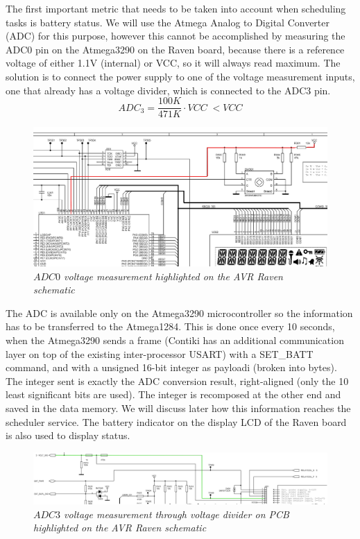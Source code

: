 The first important metric that needs to be taken into account when scheduling tasks is battery status. We will use the 
Atmega Analog to Digital Converter (ADC) for this purpose, however this cannot be accomplished by measuring the ADC0 
pin on the Atmega3290 on the Raven board, because there is a reference voltage of either 1.1V (internal) or VCC, so it 
will always read maximum. The solution is to connect the power supply to one of the voltage 
measurement inputs, one that already has a voltage divider, which is connected to the ADC3 pin.
\[ADC_3 = \frac{100K}{471K} \cdot VCC\;<VCC\]
\begin{figure}[ht]
 \begin{center}
  \includegraphics{static/adc0.png}
 \end{center}
  \caption{\small \itshape{$ADC0$ voltage measurement highlighted on the AVR Raven schematic}}

\end{figure}

The ADC is available only on the Atmega3290 microcontroller so the information has to be transferred to the Atmega1284. This is done once every 10
seconds, when the Atmega3290 sends a frame (Contiki has an additional communication layer on top of the existing inter-processor USART) with a
SET\_BATT command, and with a unsigned 16-bit integer as payloadi (broken into bytes). The integer sent is exactly the ADC conversion result, 
right-aligned (only the 10 least significant bits are used). The integer is recomposed at the other end and saved in the data memory. We will discuss
later how this information reaches the scheduler service. The battery indicator on the display LCD of the Raven board is also used to display status. 

\begin{figure}[ht]
 \begin{center}
  \includegraphics[scale=0.86]{static/voltsig.png}
 \end{center}
  \caption{\small \itshape{$ADC3$ voltage measurement through voltage divider on PCB highlighted on the AVR Raven schematic}}

\end{figure}
